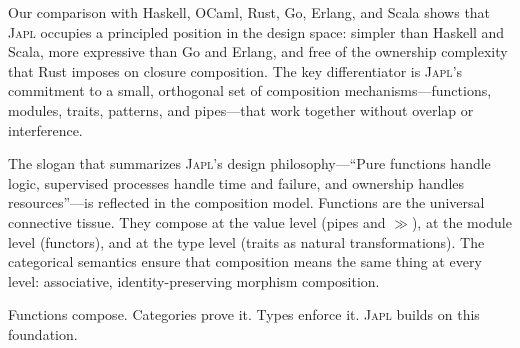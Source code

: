 \documentclass[11pt,a4paper]{article}
\newcommand{\japl}{\textsc{Japl}}
\begin{document}
Our comparison with Haskell, OCaml, Rust, Go, Erlang, and Scala shows that \japl{} occupies a principled position in the design space: simpler than Haskell and Scala, more expressive than Go and Erlang, and free of the ownership complexity that Rust imposes on closure composition. The key differentiator is \japl{}'s commitment to a small, orthogonal set of composition mechanisms---functions, modules, traits, patterns, and pipes---that work together without overlap or interference.

The slogan that summarizes \japl{}'s design philosophy---``Pure functions handle logic, supervised processes handle time and failure, and ownership handles resources''---is reflected in the composition model. Functions are the universal connective tissue. They compose at the value level (pipes and $\gg$), at the module level (functors), and at the type level (traits as natural transformations). The categorical semantics ensure that composition means the same thing at every level: associative, identity-preserving morphism composition.

Functions compose. Categories prove it. Types enforce it. \japl{} builds on this foundation.



\end{document}
